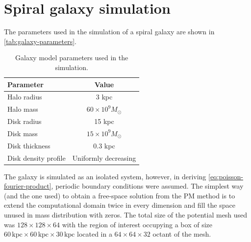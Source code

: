 \section{Spiral galaxy simulation}
The parameters used in the simulation of a spiral galaxy are shown in \autoref{tab:galaxy-parameters}.
\begin{table}[htp]
    \centering
    \begin{tabular}{|l|c|}
        \hline
        \textbf{Parameter}   & \textbf{Value}           \\
        \hline
        Halo radius          & 3 kpc                    \\
        Halo mass            & $60 \times 10^9 M_\odot$ \\
        Disk radius          & 15 kpc                   \\
        Disk mass            & $15 \times 10^9 M_\odot$ \\
        Disk thickness       & 0.3 kpc                  \\
        Disk density profile & Uniformly decreasing     \\
        \hline
    \end{tabular}
    \caption{Galaxy model parameters used in the simulation.}
    \label{tab:galaxy-parameters}
\end{table}
The galaxy is simulated as an isolated system, however, in deriving \autoref{eq:poisson-fourier-product}, periodic boundary conditions were assumed.
The simplest way (and the one used) to obtain a free-space solution from the PM method is to extend the computational domain twice in every dimension and fill the space unused in mass distribution with zeros.
The total size of the potential mesh used was $128 \times 128 \times 64$ with the region of interest occupying a box of size $60\, \text{kpc}\times 60\, \text{kpc}\times 30\, \text{kpc}$ located in a $64 \times 64 \times 32$ octant of the mesh.

